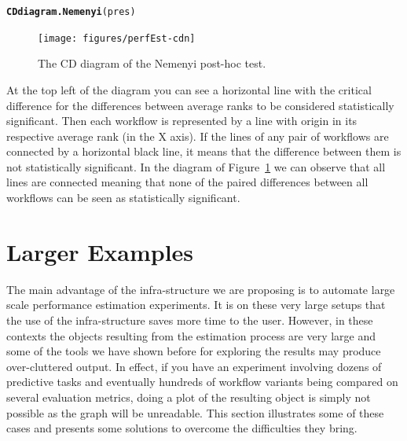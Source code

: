 \documentclass[10pt,a4paper]{article}\usepackage[]{graphicx}\usepackage[]{color}
\makeatletter
\newcommand{\hlstd}[1]{\textcolor[rgb]{0.345,0.345,0.345}{#1}}%
\newcommand{\hlkwd}[1]{\textcolor[rgb]{0.737,0.353,0.396}{\textbf{#1}}}%
\newenvironment{kframe}{%
 \def\at@end@of@kframe{}%
 \ifinner\ifhmode%
  \def\at@end@of@kframe{\end{minipage}}%
  \begin{minipage}{\columnwidth}%
 \fi\fi%
 \def\FrameCommand##1{\hskip\@totalleftmargin \hskip-\fboxsep
 \colorbox{shadecolor}{##1}\hskip-\fboxsep
     \hskip-\linewidth \hskip-\@totalleftmargin \hskip\columnwidth}%
 \MakeFramed {\advance\hsize-\width
   \@totalleftmargin\z@ \linewidth\hsize
   \@setminipage}}%
 {\par\unskip\endMakeFramed%
 \at@end@of@kframe}
\newenvironment{knitrout}{}{} %
\makeatother
\begin{document}
\begin{knitrout}\scriptsize
{}\color{fgcolor}\begin{kframe}
\begin{alltt}
\hlkwd{CDdiagram.Nemenyi}\hlstd{(pres)}
\end{alltt}
\end{kframe}\begin{figure}[]


{\centering \texttt{[image: figures/perfEst-cdn]} 

}

\caption[The CD diagram of the Nemenyi post-hoc test]{The CD diagram of the Nemenyi post-hoc test.\label{fig:cdn}}
\end{figure}


\end{knitrout}

At the top left of the diagram you can see a horizontal line with the critical difference for the differences between average ranks to be considered statistically significant. Then each workflow is represented by a line with origin in its respective average rank (in the X axis). If the lines of any pair of workflows are connected by a horizontal black line, it means that the difference between them is not statistically significant. In the diagram of Figure~\ref{fig:cdn} we can observe that all lines are connected meaning that none of the paired differences between all workflows can be seen as statistically significant.



\section{Larger Examples}

The main advantage of the infra-structure we are proposing is to
automate large scale performance estimation experiments. It is on these very
large setups that the use of the infra-structure saves more time to
the user. However, in these contexts the objects resulting from the
estimation process are very large and some of the tools we have shown before
for exploring the results may produce over-cluttered output. In
effect, if you have an experiment involving dozens of predictive tasks
and eventually hundreds of workflow variants being compared on several
evaluation metrics, doing a plot of the resulting object is simply not
possible as the graph will be unreadable. This section illustrates
some of these cases and presents some solutions to overcome the
difficulties they bring.
\end{document}
